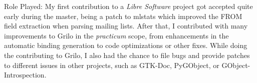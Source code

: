 \begin{description}
\item {Role Played:} My first contribution to a {\it Libre Software}
project got accepted quite early during the master, being a patch to mlstats which
improved the FROM field extraction when parsing mailing lists. After that,
I contributed with many improvements to Grilo in the {\it practicum} scope,
from enhancements in the automatic binding generation to code optimizations or other
fixes. While doing the contributing to Grilo, I also had the chance to file bugs
and provide patches to different issues in other projects, such as GTK-Doc, PyGObject,
or GObject-Introspection.
\end{description}
